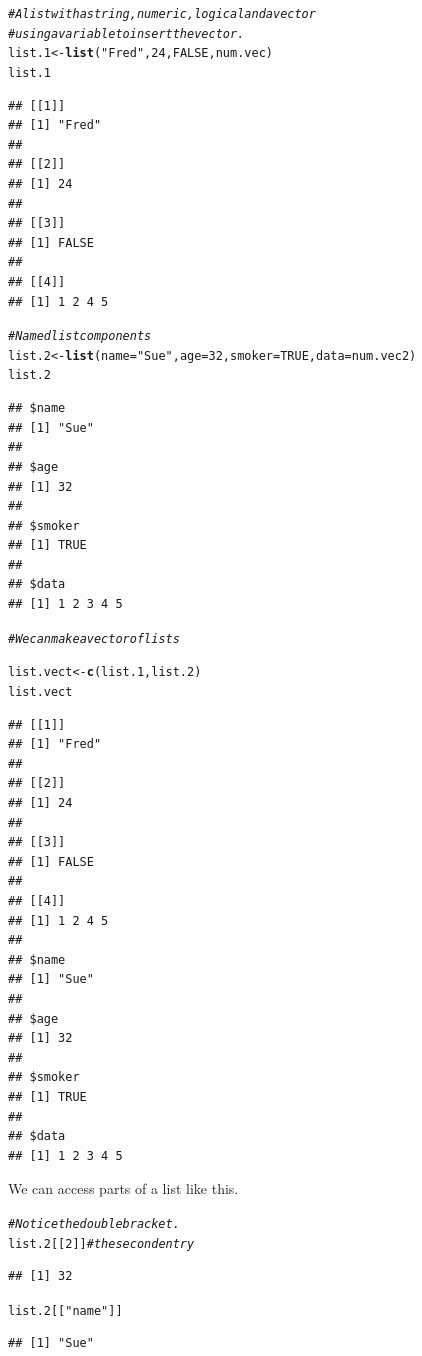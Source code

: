 \documentclass{article}\usepackage[]{graphicx}\usepackage[]{color}
\makeatletter
\newcommand{\hlnum}[1]{\textcolor[rgb]{0.686,0.059,0.569}{#1}}%
\newcommand{\hlstr}[1]{\textcolor[rgb]{0.192,0.494,0.8}{#1}}%
\newcommand{\hlcom}[1]{\textcolor[rgb]{0.678,0.584,0.686}{\textit{#1}}}%
\newcommand{\hlstd}[1]{\textcolor[rgb]{0.345,0.345,0.345}{#1}}%
\newcommand{\hlkwb}[1]{\textcolor[rgb]{0.69,0.353,0.396}{#1}}%
\newcommand{\hlkwc}[1]{\textcolor[rgb]{0.333,0.667,0.333}{#1}}%
\newcommand{\hlkwd}[1]{\textcolor[rgb]{0.737,0.353,0.396}{\textbf{#1}}}%
\newenvironment{kframe}{%
 \def\at@end@of@kframe{}%
 \ifinner\ifhmode%
  \def\at@end@of@kframe{\end{minipage}}%
  \begin{minipage}{\columnwidth}%
 \fi\fi%
 \def\FrameCommand##1{\hskip\@totalleftmargin \hskip-\fboxsep
 \colorbox{shadecolor}{##1}\hskip-\fboxsep
     \hskip-\linewidth \hskip-\@totalleftmargin \hskip\columnwidth}%
 \MakeFramed {\advance\hsize-\width
   \@totalleftmargin\z@ \linewidth\hsize
   \@setminipage}}%
 {\par\unskip\endMakeFramed%
 \at@end@of@kframe}
\newenvironment{knitrout}{}{} %
\makeatother
\begin{document}
\begin{knitrout}
\color{fgcolor}\begin{kframe}
\begin{alltt}
  \hlcom{# A list with a string, numeric, logical and a vector}
  \hlcom{# using a variable to insert the vector.}
  \hlstd{list.1} \hlkwb{<-} \hlkwd{list}\hlstd{(}\hlstr{"Fred"}\hlstd{,} \hlnum{24}\hlstd{,} \hlnum{FALSE}\hlstd{, num.vec)}
  \hlstd{list.1}
\end{alltt}
\begin{verbatim}
## [[1]]
## [1] "Fred"
## 
## [[2]]
## [1] 24
## 
## [[3]]
## [1] FALSE
## 
## [[4]]
## [1] 1 2 4 5
\end{verbatim}
\begin{alltt}
  \hlcom{# Named list components}
  \hlstd{list.2} \hlkwb{<-} \hlkwd{list}\hlstd{(}\hlkwc{name}\hlstd{=}\hlstr{"Sue"}\hlstd{,} \hlkwc{age}\hlstd{=}\hlnum{32}\hlstd{,} \hlkwc{smoker}\hlstd{=}\hlnum{TRUE}\hlstd{,} \hlkwc{data}\hlstd{=num.vec2)}
  \hlstd{list.2}
\end{alltt}
\begin{verbatim}
## $name
## [1] "Sue"
## 
## $age
## [1] 32
## 
## $smoker
## [1] TRUE
## 
## $data
## [1] 1 2 3 4 5
\end{verbatim}
\begin{alltt}
  \hlcom{# We can make a vector of lists}

  \hlstd{list.vect} \hlkwb{<-} \hlkwd{c}\hlstd{(list.1, list.2)}
  \hlstd{list.vect}
\end{alltt}
\begin{verbatim}
## [[1]]
## [1] "Fred"
## 
## [[2]]
## [1] 24
## 
## [[3]]
## [1] FALSE
## 
## [[4]]
## [1] 1 2 4 5
## 
## $name
## [1] "Sue"
## 
## $age
## [1] 32
## 
## $smoker
## [1] TRUE
## 
## $data
## [1] 1 2 3 4 5
\end{verbatim}
\end{kframe}
\end{knitrout}
    
    We can access parts of a list like this.
    
\begin{knitrout}
\color{fgcolor}\begin{kframe}
\begin{alltt}
  \hlcom{# Notice the double bracket.}
  \hlstd{list.2[[}\hlnum{2}\hlstd{]]}  \hlcom{# the second entry}
\end{alltt}
\begin{verbatim}
## [1] 32
\end{verbatim}
\begin{alltt}
  \hlstd{list.2[[}\hlstr{"name"}\hlstd{]]}
\end{alltt}
\begin{verbatim}
## [1] "Sue"
\end{verbatim}
\end{kframe}
\end{knitrout}
    
\end{document}
